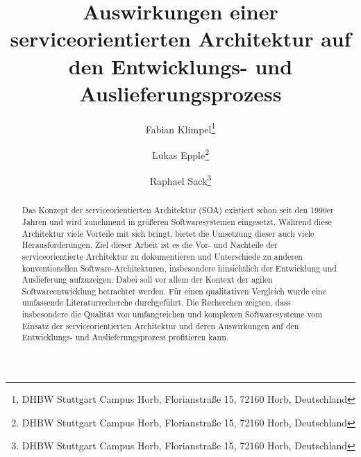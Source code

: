 \documentclass[biblatex]{lni}
\begin{document}
\title[Auswirkungen von SOA]{Auswirkungen einer serviceorientierten Architektur auf den Entwicklungs- und Auslieferungsprozess}
\author[Fabian Klimpel \and Lukas Epple \and Raphael Sack]
{Fabian Klimpel\footnote{DHBW Stuttgart Campus Horb, Florianstraße 15, 72160 Horb, Deutschland } \and
Lukas Epple\footnote{DHBW Stuttgart Campus Horb, Florianstraße 15, 72160 Horb, Deutschland } \and 
Raphael Sack\footnote{DHBW Stuttgart Campus Horb, Florianstraße 15, 72160 Horb, Deutschland }}
\maketitle

\begin{abstract}
    Das Konzept der serviceorientierten Architektur (SOA) existiert schon seit den 1990er Jahren und wird zunehmend in größeren Softwaresystemen eingesetzt. Während diese Architektur viele Vorteile mit sich bringt, bietet die Umsetzung dieser auch viele Herausforderungen. Ziel dieser Arbeit ist es die Vor- und Nachteile der serviceorientierte Architektur zu dokumentieren und Unterschiede zu anderen konventionellen Software-Architekturen, insbesondere hinsichtlich der Entwicklung und Auslieferung aufzuzeigen.  Dabei soll vor allem der Kontext der agilen Softwareentwicklung betrachtet werden. Für einen qualitativen Vergleich wurde eine umfassende Literaturrecherche durchgeführt. Die Recherchen zeigten, dass insbesondere die Qualität von umfangreichen und komplexen Softwaresysteme vom Einsatz der serviceorientierten Architektur und deren Auswirkungen auf den Entwicklungs- und Auslieferungsprozess profitieren kann.
\end{abstract}






\newpage
{}
\setcounter{section}{0}
\setcounter{secnumdepth}{0}

\newpage
\printbibliography%
\end{document}
